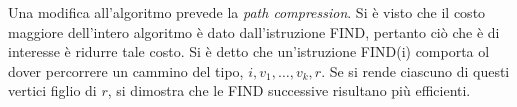 \documentclass{subfiles}
\begin{document}
\noindent Una modifica all'algoritmo prevede la \emph{path compression}. Si è visto che il costo maggiore dell'intero algoritmo è dato dall'istruzione FIND,
pertanto ciò che è di interesse è ridurre tale costo. Si è detto che un'istruzione FIND(i) comporta ol dover percorrere un cammino del tipo, \(i, v_{1}, \ldots, v_{k}, r\).
Se si rende ciascuno di questi vertici figlio di \(r\), si dimostra che le FIND successive risultano più efficienti.
\end{document}
